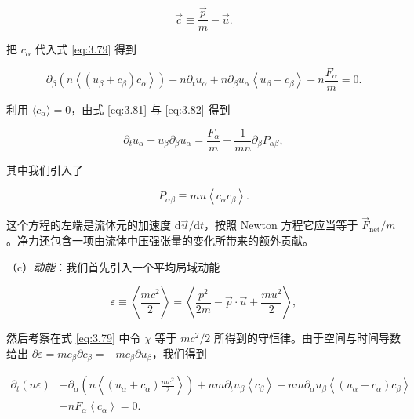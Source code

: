 \begin{equation}\label{eq:3.82}
  \vec c\equiv\frac{\vec p}{m}-\vec u.
\end{equation}

把 $c_\alpha$ 代入式 \eqref{eq:3.79} 得到

\begin{equation}\label{eq:3.83}
  \partial_\beta\left(n\left\langle\left(u_\beta+c_\beta\right)c_\alpha\right\rangle\right)+n\partial_tu_\alpha+n\partial_\beta u_\alpha\left\langle u_\beta+c_\beta\right\rangle-n\frac{F_\alpha}{m}=0.
\end{equation}

利用 $\langle c_\alpha\rangle=0$，由式 \eqref{eq:3.81} 与 \eqref{eq:3.82} 得到

\begin{equation}\label{eq:3.84}
  \partial_tu_\alpha+u_\beta\partial_\beta u_\alpha=\frac{F_\alpha}{m}-\frac{1}{mn}\partial_\beta P_{\alpha\beta},
\end{equation}

其中我们引入了

\begin{equation}\label{eq:3.85}
  P_{\alpha\beta}\equiv mn\left\langle c_\alpha c_\beta\right\rangle.
\end{equation}

这个方程的左端是流体元的加速度 $\mathrm{d}\vec u/\mathrm{d}t$，按照 Newton 方程它应当等于 $\vec F_{\text{net}}/m$。净力还包含一项由流体中压强张量的变化所带来的额外贡献。

（c）\emph{动能}：我们首先引入一个平均局域动能

\begin{equation}\label{eq:3.86}
  \varepsilon\equiv\left\langle\frac{mc^2}{2}\right\rangle=\left\langle\frac{p^2}{2m}-\vec p\cdot\vec u+\frac{mu^2}{2}\right\rangle,
\end{equation}

然后考察在式 \eqref{eq:3.79} 中令 $\chi$ 等于 $mc^2/2$ 所得到的守恒律。由于空间与时间导数给出 $\partial\varepsilon=mc_\beta\partial c_\beta=-mc_\beta\partial u_\beta$，我们得到

\begin{equation}\label{eq:3.87}
  \begin{aligned}
    \partial_t(n\varepsilon)&+\partial_\alpha\left(n\left\langle(u_\alpha+c_\alpha)\frac{mc^2}{2}\right\rangle\right)+nm\partial_tu_\beta\left\langle c_\beta\right\rangle+nm\partial_\alpha u_\beta\left\langle(u_\alpha+c_\alpha)c_\beta\right\rangle\\
    &-nF_\alpha\left\langle c_\alpha\right\rangle=0.
  \end{aligned}
\end{equation}

